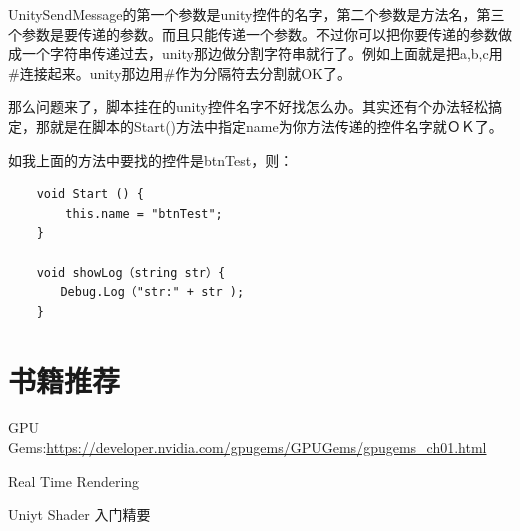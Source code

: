 \documentclass[UTF8,a4paper,12pt]{ctexbook}
\begin{document}
			UnitySendMessage的第一个参数是unity控件的名字，第二个参数是方法名，第三个参数是要传递的参数。而且只能传递一个参数。不过你可以把你要传递的参数做成一个字符串传递过去，unity那边做分割字符串就行了。例如上面就是把a,b,c用\#连接起来。unity那边用\#作为分隔符去分割就OK了。
		
			那么问题来了，脚本挂在的unity控件名字不好找怎么办。其实还有个办法轻松搞定，那就是在脚本的Start()方法中指定name为你方法传递的控件名字就ＯＫ了。
			
			如我上面的方法中要找的控件是btnTest，则：
			\begin{lstlisting}
	void Start () {
	    this.name = "btnTest";
	}
	
	void showLog（string str）{
	　　Debug.Log（"str:" + str );
	}
			\end{lstlisting}
	
\chapter{书籍推荐}
	
	GPU Gems:\url{https://developer.nvidia.com/gpugems/GPUGems/gpugems_ch01.html}
	
	Real Time Rendering
	
	Uniyt Shader 入门精要
	
\end{document}
